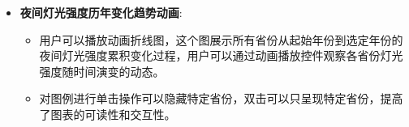 \documentclass[14pt,a4paper,UTF8,twoside]{article}
\begin{document}
\begin{itemize}
    \item \textbf{夜间灯光强度历年变化趋势动画}:
    \begin{itemize}
        \item 用户可以播放动画折线图，这个图展示所有省份从起始年份到选定年份的夜间灯光强度累积变化过程，用户可以通过动画播放控件观察各省份灯光强度随时间演变的动态。
        \item 对图例进行单击操作可以隐藏特定省份，双击可以只呈现特定省份，提高了图表的可读性和交互性。
    \end{itemize}
    \begin{figure}[H]
    \centering
    \begin{minipage}{.45\linewidth}
    \centering
    \label{MLEDdet}
    \end{minipage}
    \quad
    \begin{minipage}{.45\linewidth}
    \centering
    \label{energydetPSK}
    \end{minipage}

\end{figure}
\end{itemize}
\end{document}
